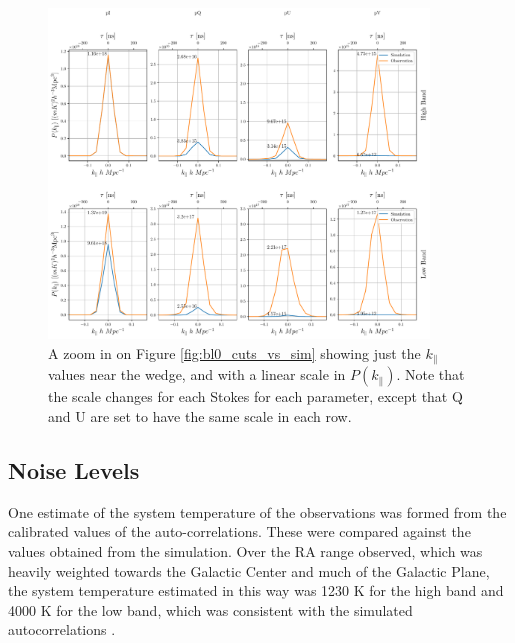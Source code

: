 \documentclass[twocolumn, trackchanges]{aastex61}
\begin{document}
\begin{figure}[h]
\centering
\includegraphics[width=0.9\textwidth]{ps_peak_zoom.pdf}
\caption{A zoom in on Figure \ref{fig:bl0_cuts_vs_sim} showing just the
  $k_\parallel$ values near the wedge, and with a linear scale in
  $P(k_\parallel)$.  Note that the scale changes for each Stokes for each
  parameter, except that Q and U are set to have the same scale in each row.}
\label{fig:bl0_cuts_vs_sim_zoom}
\end{figure}


\subsection{Noise Levels}
\label{sec:Noise}

One estimate of the system temperature of the observations was formed from the
calibrated values of the auto-correlations.  These were compared against the
values obtained from the simulation.  Over the RA range observed, which was
heavily weighted towards the Galactic Center and much of the Galactic Plane, the
system temperature estimated in this way was 1230 K for the high band and 4000 K
for the low band, which was consistent with the simulated autocorrelations
\citep[][also see the public
\href{http://reionization.org/wp-content/uploads/2017/04/HERA19_Tsys_3April2017.pdf}{\underline{HERA
    Memo \#16}}]{deBoer17}.
\end{document}
